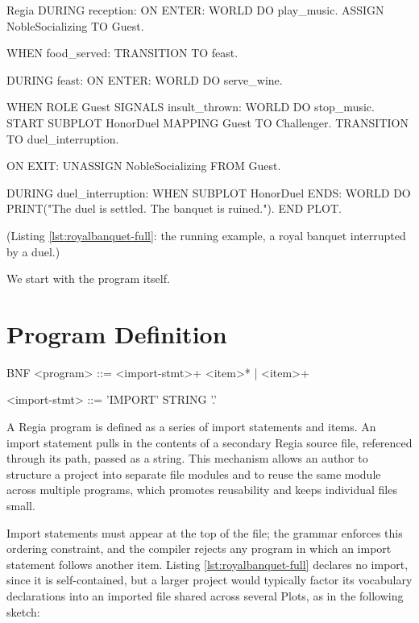 \begin{codeblock}[title=Regia DSL Example]{Regia}
    DURING reception:
        ON ENTER:
            WORLD DO play_music.
            ASSIGN NobleSocializing TO Guest.
            
        WHEN food_served:
            TRANSITION TO feast.

    DURING feast:
        ON ENTER:
            WORLD DO serve_wine.
            
        WHEN ROLE Guest SIGNALS insult_thrown:
            WORLD DO stop_music.
            START SUBPLOT HonorDuel MAPPING Guest TO Challenger.
            TRANSITION TO duel_interruption.
            
        ON EXIT:
            UNASSIGN NobleSocializing FROM Guest.

    DURING duel_interruption:
        WHEN SUBPLOT HonorDuel ENDS:
            WORLD DO PRINT("The duel is settled. The banquet is ruined.").
            END PLOT.
\end{codeblock}
\label{lst:royalbanquet-full}

\begin{center}
(Listing \ref{lst:royalbanquet-full}: the running example, a royal banquet interrupted by a duel.)
\end{center}

We start with the program itself.

\section{Program Definition}
\label{sec:program:definition}

\begin{codeblock}[]{BNF}
    <program>        ::= <import-stmt>+ <item>*
                       | <item>+
    
    <import-stmt>    ::= 'IMPORT' STRING '.'
\end{codeblock}

A Regia program is defined as a series of import statements and items. An import statement pulls in the contents of a secondary Regia source file, referenced through its path, passed as a string. This mechanism allows an author to structure a project into separate file modules and to reuse the same module across multiple programs, which promotes reusability and keeps individual files small. 

Import statements must appear at the top of the file; the grammar enforces this ordering constraint, and the compiler rejects any program in which an import statement follows another item. Listing \ref{lst:royalbanquet-full} declares no import, since it is self-contained, but a larger project would typically factor its vocabulary declarations into an imported file shared across several Plots, as in the following sketch:

